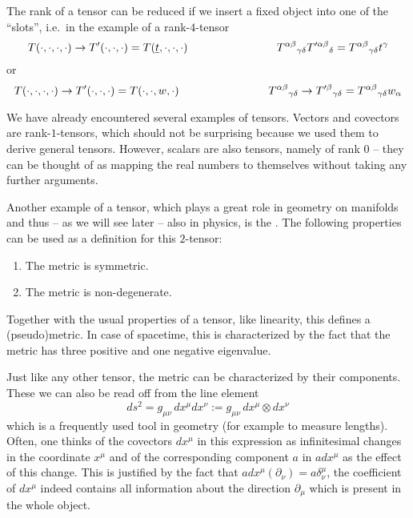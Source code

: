\documentclass[ART_main.tex]{subfiles}
\begin{document}
The rank of a tensor can be reduced if we insert a fixed object into one of the \enquote{slots}, i.e.~in the example of a rank-$4$-tensor
\begin{equation}
T(\cdot, \cdot, \cdot, \cdot) \rightarrow T'(\cdot, \cdot, \cdot) = T(\underline{t}, \cdot, \cdot, \cdot) \qquad \qquad \qquad \qquad T^{\alpha \beta}{}_{\gamma \delta} T'^{\alpha \beta}{}_{\delta} = T^{\alpha \beta}{}_{\gamma \delta} t^\gamma
\end{equation}
or
\begin{equation}
T(\cdot, \cdot, \cdot, \cdot) \rightarrow T'(\cdot, \cdot, \cdot) = T(\cdot, \cdot, w, \cdot)
\qquad \qquad \qquad \qquad
T^{\alpha \beta}{}_{\gamma \delta} \rightarrow T'^{\beta}{}_{\gamma \delta} = T^{\alpha \beta}{}_{\gamma \delta} w_\alpha
\end{equation}



\begin{ex}
We have already encountered several examples of tensors. Vectors and covectors are rank-$1$-tensors, which should not be surprising because we used them to derive general tensors. However, scalars are also tensors, namely of rank $0$ -- they can be thought of as mapping the real numbers to themselves without taking any further arguments.
\end{ex}


Another example of a tensor, which plays a great role in geometry on manifolds and thus -- as we will see later -- also in physics, is the . The following properties can be used as a definition for this $2$-tensor:
\begin{enumerate}[(1.)]
\item The metric is symmetric.


\item The metric is non-degenerate.
\end{enumerate}
Together with the usual properties of a tensor, like linearity, this defines a (pseudo)metric. In case of spacetime, this is characterized by the fact that the metric has three positive and one negative eigenvalue.

Just like any other tensor, the metric can be characterized by their components. These we can also be read off from the line element
\begin{equation}
ds^2 = g_{\mu \nu} \, dx^\mu dx^\nu := g_{\mu \nu} \, dx^\mu \otimes dx^\nu
\end{equation}
which is a frequently used tool in geometry (for example to measure lengths). Often, one thinks of the covectors $dx^\mu$ in this expression as infinitesimal changes in the coordinate $x^\mu$ and of the corresponding component $a$ in $a dx^\mu$ as the effect of this change. This is justified by the fact that $a dx^\mu(\partial_\nu) = a \delta^\mu_\nu$, the coefficient of $dx^\mu$ indeed contains all information about the direction $\partial_\mu$ which is present in the whole object.
\end{document}
